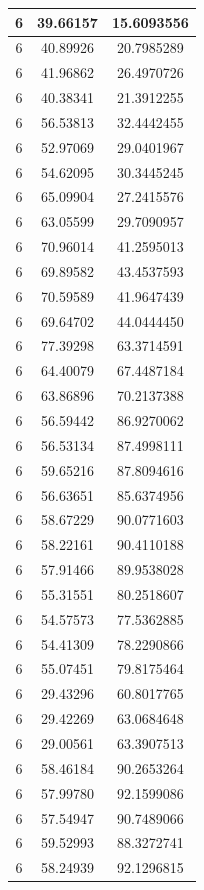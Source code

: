 \documentclass[
]{book}
\begin{document}
\begin{tabular}{c|c|c}
\hline
6 & 39.66157 & 15.6093556\\
\hline
6 & 40.89926 & 20.7985289\\
\hline
6 & 41.96862 & 26.4970726\\
\hline
6 & 40.38341 & 21.3912255\\
\hline
6 & 56.53813 & 32.4442455\\
\hline
6 & 52.97069 & 29.0401967\\
\hline
6 & 54.62095 & 30.3445245\\
\hline
6 & 65.09904 & 27.2415576\\
\hline
6 & 63.05599 & 29.7090957\\
\hline
6 & 70.96014 & 41.2595013\\
\hline
6 & 69.89582 & 43.4537593\\
\hline
6 & 70.59589 & 41.9647439\\
\hline
6 & 69.64702 & 44.0444450\\
\hline
6 & 77.39298 & 63.3714591\\
\hline
6 & 64.40079 & 67.4487184\\
\hline
6 & 63.86896 & 70.2137388\\
\hline
6 & 56.59442 & 86.9270062\\
\hline
6 & 56.53134 & 87.4998111\\
\hline
6 & 59.65216 & 87.8094616\\
\hline
6 & 56.63651 & 85.6374956\\
\hline
6 & 58.67229 & 90.0771603\\
\hline
6 & 58.22161 & 90.4110188\\
\hline
6 & 57.91466 & 89.9538028\\
\hline
6 & 55.31551 & 80.2518607\\
\hline
6 & 54.57573 & 77.5362885\\
\hline
6 & 54.41309 & 78.2290866\\
\hline
6 & 55.07451 & 79.8175464\\
\hline
6 & 29.43296 & 60.8017765\\
\hline
6 & 29.42269 & 63.0684648\\
\hline
6 & 29.00561 & 63.3907513\\
\hline
6 & 58.46184 & 90.2653264\\
\hline
6 & 57.99780 & 92.1599086\\
\hline
6 & 57.54947 & 90.7489066\\
\hline
6 & 59.52993 & 88.3272741\\
\hline
6 & 58.24939 & 92.1296815\\

\end{tabular}
\end{document}
